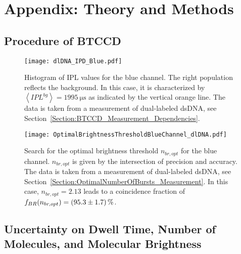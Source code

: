 \chapter{Appendix: Theory and Methods}

\section{Procedure of BTCCD} \label{Appendix:ProcedureOfBTCCD}

\vfill
\begin{figure}[h]
	\centering
	\texttt{[image: dlDNA\_IPD\_Blue.pdf]}
	\caption[Determination of background in \gls{IPL} time trace for blue channel]{Histogram of \gls{IPL} values for the blue channel. The right population reflects the background. In this case, it is characterized by $\left\langle IPL^{bg} \right\rangle = \SI{1995}{\micro\second}$ as indicated by the vertical orange line. The data is taken from a measurement of dual-labeled \gls{dsDNA}, see Section~\ref{Section:BTCCD_Measurement_Dependencies}.}
	\label{fig:IPLBackground_Blue}
\end{figure}  
\vfill
    
\vfill
\begin{figure}[h]
	\centering
	\texttt{[image: OptimalBrightnessThresholdBlueChannel\_dlDNA.pdf]}
	\caption[Search for optimal brightness threshold $n_{br, opt}$ for blue channel]{Search for the optimal brightness threshold $n_{br, opt}$ for the blue channel. $n_{br, opt}$ is given by the intersection of precision and accuracy. The data is taken from a measurement of dual-labeled \gls{dsDNA}, see Section~\ref{Section:OptimalNumberOfBursts_Measurement}. In this case, $n_{br, opt}=\num{2.13}$ leads to a coincidence fraction of $f_{BR}(n_{br, opt}) = \SI{95.3 +- 1.7}{\percent}$.}
	\label{fig:OptimalBrightnessThresholdBlueChannel_dlDNA}
\end{figure}
\vfill
\clearpage

\section{Uncertainty on Dwell Time, Number of Molecules, and Molecular Brightness} \label{Appendix:UncertaintyDwellTime}

